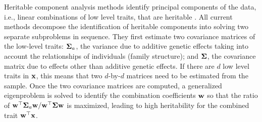 \documentclass[10pt,letterpaper]{article}
\newcommand{\matrx}[1]{\ensuremath\boldsymbol{\rm #1}}
\newcommand{\vect}[1]{\ensuremath\boldsymbol{\rm #1}}
\begin{document}

Heritable component analysis methods identify principal components of the data, i.e., linear combinations of low level traits, that are heritable \cite{Ott:1999:pch,Wang:2007:pch-ridge,Klei:2008:pch,pch:Oualkacha:2012}. All current methods decompose the identification of heritable components into solving two separate subproblems in sequence. They first estimate two covariance matrices of the low-level traits: $\matrx \Sigma_a$, the variance due to additive genetic effects taking into account the relationships of individuals (family structure); and $\matrx \Sigma$, the covariance matrix due to effects other than additive genetic effects. If there are $d$ low level traits in $\vect x$, this means that two $d$-by-$d$ matrices need to be estimated from the sample. Once the two covariance matrices are computed, a generalized eigenproblem is solved to identify the combination coefficients $\vect w$ so that the ratio of $\vect w ^\top \matrx \Sigma_a \vect w / \vect w^\top \matrx \Sigma \vect w$ is maximized, leading to high heritability for the combined trait $\vect w^\top \vect x$. 
\end{document}
